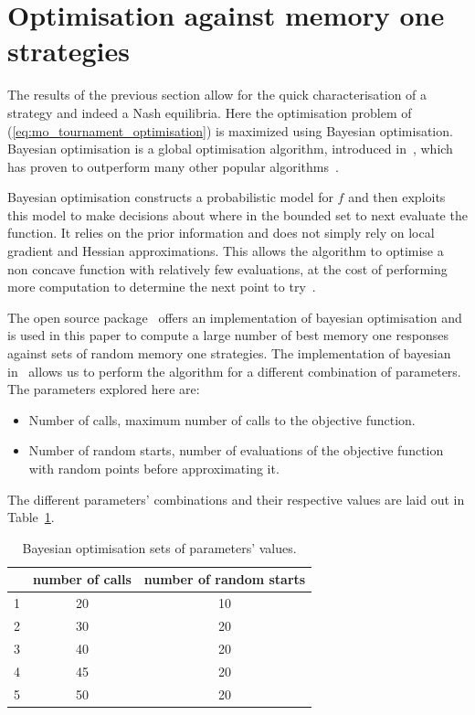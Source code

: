 \documentclass[10pt]{article}
\begin{document}
\section{Optimisation against memory one strategies}\label{section:optimisation_memone}

The results of the previous section allow for the quick characterisation of a
strategy and indeed a Nash equilibria.
Here the optimisation problem of (\ref{eq:mo_tournament_optimisation})
is maximized using Bayesian optimisation. Bayesian optimisation is a
global optimisation algorithm, introduced in~\cite{Mokus1978}, which has proven to
outperform many other popular algorithms~\cite{Jones2001}.

Bayesian optimisation constructs a probabilistic
model for \(f\) and then exploits this model to make decisions about where in the
bounded set to next evaluate the function. It relies on the prior information
and does not simply rely on local gradient and Hessian approximations.
This allows the algorithm to optimise a non concave function with relatively few
evaluations, at the cost of performing more computation to determine the next point
to try~\cite{snoek2012}.

The open source package~\cite{Head2018} offers an implementation of bayesian
optimisation and is used in this paper to compute a large number of best memory
one responses against sets of random memory one strategies. The implementation
of bayesian in~\cite{Head2018} allows us to perform the algorithm for a
different combination of parameters.  The parameters explored here are:

\begin{itemize}
    \item Number of calls, maximum number of calls to the objective function.
    \item Number of random starts, number of evaluations of the objective function
    with random points before approximating it.
\end{itemize}

The different parameters' combinations and their respective values are laid out in
Table~\ref{table:ba_opt}.

\begin{table}[htbp]
\begin{center}
\begin{tabular}{ccc}
    \toprule
    {} &  number of calls & number of random starts\\
    \midrule
    1 & 20 & 10 \\
    2 & 30 & 20 \\
    3 & 40 & 20 \\
    4 & 45 & 20 \\
    5 & 50 & 20 \\
    \bottomrule
\end{tabular}
\end{center}
\caption{Bayesian optimisation sets of parameters' values.}
\label{table:ba_opt}
\end{table}
\end{document}
